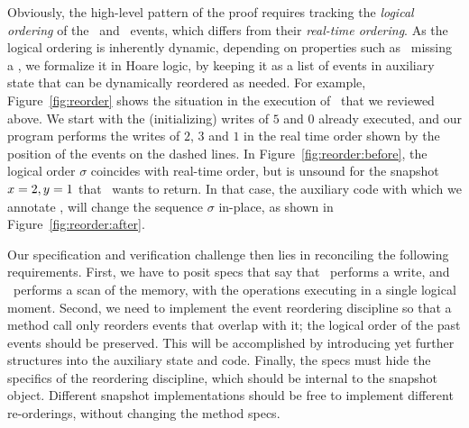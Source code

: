 \documentclass[a4paper,UKenglish]{lipics-v2016}
\newcommand{\ie}{\emph{i.e.}\xspace}
\def\ordlist{\sigma}
\theoremstyle{definition}
\begin{document}
Obviously, the high-level pattern of the proof requires tracking the
\emph{logical ordering} of the \jywrite\ and \jyscan\ events, which
differs from their \emph{real-time ordering}. As the logical ordering
is inherently dynamic, depending on properties such as
\jyscan\ missing a \jywrite, we formalize it in Hoare logic, by
keeping it as a list of events in auxiliary state that can be
dynamically reordered as needed. For example, Figure~\ref{fig:reorder}
shows the situation in the execution of \jyscan~that we reviewed
above. We start with the (initializing) writes of $5$ and $0$ already
executed, and our program performs the writes of $2$, $3$ and $1$ in
the real time order shown by the position of the events on the dashed
lines. In Figure~\ref{fig:reorder:before}, the logical order
$\ordlist$ coincides with real-time order, but is unsound for the
snapshot $x=2, y=1$ that \jyscan~wants to return. In that case, the
auxiliary code with which we annotate \jyscan, will change the
sequence $\ordlist$ in-place, as shown in
Figure~\ref{fig:reorder:after}.

Our specification and verification challenge then lies in reconciling
the following requirements. First, we have to posit specs that
say that \jywrite\ performs a write, and \jyscan\ performs a scan of
the memory, with the operations executing in a single logical
moment. Second, we need to implement the event reordering discipline
so that a method call only reorders events that overlap with it; the
logical order of the past events should be preserved. This will be
accomplished by introducing yet further structures into the auxiliary
state and code. Finally, the specs must hide the specifics of
the reordering discipline, which should be internal to the snapshot
object. Different snapshot implementations should be free to implement
different re-orderings, without changing the method specs.

\end{document}
